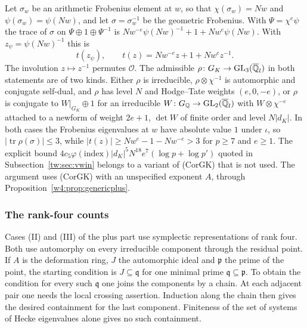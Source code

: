 \begin{remark}\label{w4:rem:normalization}
Let $\sigma_w$ be an arithmetic Frobenius element at $w$, so that $\chi(\sigma_w)=Nw$ and $\psi(\sigma_w)=\psi(Nw)$, and let $\sigma=\sigma_w^{-1}$ be the geometric Frobenius. With $\Psi=\chi^e\psi$ the trace of $\sigma$ on $\Psi\oplus1\oplus\Psi^{-1}$ is $Nw^{-e}\psi(Nw)^{-1}+1+Nw^{e}\psi(Nw)$. With $z_\psi=\psi(Nw)^{-1}$ this is
\[
t(z_\psi),\qquad t(z)=Nw^{-e}z+1+Nw^{e}z^{-1}.
\]
The involution $z\mapsto z^{-1}$ permutes $\mathcal O$. The admissible $\rho\colon G_K\to\mathrm{GL}_3(\overline{\mathbb Q}_l)$ in both statements are of two kinds. Either $\rho$ is irreducible, $\rho\otimes\chi^{-1}$ is automorphic and conjugate self-dual, and $\rho$ has level $N$ and Hodge--Tate weights $(e,0,-e)$, or $\rho$ is conjugate to $W|_{G_K}\oplus1$ for an irreducible $W\colon G_\mathbb Q\to\mathrm{GL}_2(\overline{\mathbb Q}_l)$ with $W\otimes\chi^{-e}$ attached to a newform of weight $2e+1$, $\det W$ of finite order and level $N\lvert d_K\rvert$. In both cases the Frobenius eigenvalues at $w$ have absolute value $1$ under $\iota$, so $\lvert\operatorname{tr}\rho(\sigma)\rvert\le3$, while $\lvert t(z)\rvert\ge Nw^{e}-1-Nw^{-e}>3$ for $p\ge7$ and $e\ge1$. The explicit bound $4c_5\varphi(\mathrm{index})\lvert d_K\rvert^5N^{18}e^7(\log p+\log p')$ quoted in Subsection~\ref{tw:sec:vwin} belongs to a variant of (CorGK) that is not used. The argument uses (CorGK) with an unspecified exponent $A$, through Proposition~\ref{w4:prop:genericplus}.
\end{remark}


\subsubsection{The rank-four counts}\label{tw:rankfour}

Cases (II) and (III) of the plus part use symplectic representations of
rank four. Both use automorphy on every irreducible component through the
residual point. If $A$ is the deformation ring, $J$ the automorphic ideal
and $\mathfrak p$ the prime of the point, the starting condition is
$J\subseteq\mathfrak q$ for one minimal prime $\mathfrak q\subseteq
\mathfrak p$. To obtain the condition for every such $\mathfrak q$ one
joins the components by a chain. At each adjacent pair one needs the
local crossing assertion. Induction along the chain then gives the desired
containment for the last component. Finiteness of the set of systems of
Hecke eigenvalues alone gives no such containment.

